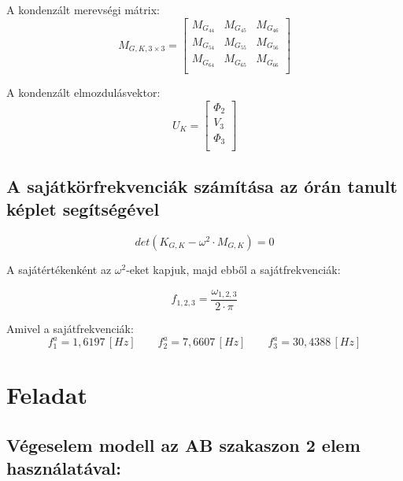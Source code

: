 \documentclass{article}
\begin{document}
			A kondenzált merevségi mátrix: 
			\begin{equation}
				M_{G,K,3\times3}=
				\begin{bmatrix}
				M_{G_{44}}	 & M_{G_{45}}	 & M_{G_{46}}   \\
				M_{G_{54}}	 & M_{G_{55}}	 & M_{G_{56}}   \\
				M_{G_{64}}	 & M_{G_{65}}	 & M_{G_{66}}   \\
				\end{bmatrix}
			\end{equation}
			
			A kondenzált elmozdulásvektor:
			\begin{equation}
				U_K=
				\begin{bmatrix}
				\Phi_{2} \\
				V_{3}    \\
				\Phi_{3} \\
				\end{bmatrix}
			\end{equation} 
	
	\subsection{A sajátkörfrekvenciák számítása az órán tanult képlet segítségével}
	
		\begin{equation}
			det(K_{G,K} - \omega^2 \cdot M_{G,K}) = 0
		\end{equation}
		
		A sajátértékenként az $\omega^2$-eket kapjuk, majd ebből a sajátfrekvenciák:
		
		\begin{equation}
			f_{1,2,3}=\frac{\omega_{1,2,3}}{2\cdot \pi}
		\end{equation}
		
		Amivel a sajátfrekvenciák:	
		\[f_1^a=1,6197\, [Hz] \qquad f_2^a=7,6607\, [Hz] \qquad f_3^a=30,4388\, [Hz]  \]
	
	\section{Feladat}
	
		\subsection{Végeselem modell az \textbf{AB} szakaszon 2 elem használatával:}
	
\end{document}
